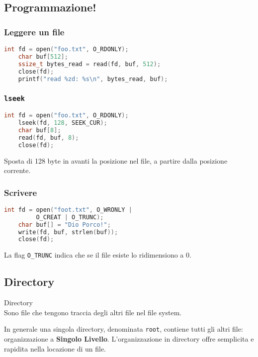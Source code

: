 \subsection{Programmazione!}
\subsubsection{Leggere un file}
\begin{lstlisting}[language=c]
    int fd = open("foo.txt", O_RDONLY);
    char buf[512];
    ssize_t bytes_read = read(fd, buf, 512);
    close(fd);
    printf("read %zd: %s\n", bytes_read, buf);
\end{lstlisting}

\subsubsection{\texttt{lseek}}
\begin{lstlisting}[language=c]
    int fd = open("foo.txt", O_RDONLY);
    lseek(fd, 128, SEEK_CUR);
    char buf[8];
    read(fd, buf, 8);
    close(fd);
\end{lstlisting}

Sposta di 128 byte in avanti la posizione nel file, a partire dalla posizione corrente.

\subsubsection{Scrivere}

\begin{lstlisting}[language=c]
    int fd = open("foot.txt", O_WRONLY |
         O_CREAT | O_TRUNC);
    char buf[] = "Dio Porco!";
    write(fd, buf, strlen(buf));
    close(fd);
\end{lstlisting}

La flag \lstinline{O_TRUNC} indica che se il file esiste lo ridimensiono a 0. 

\subsection{Directory}
\begin{definition} Directory \\
Sono file che tengono traccia degli altri file nel file system. 
\end{definition}

In generale una singola directory, denominata \texttt{root}, contiene tutti gli altri file: organizzazione a \textbf{Singolo Livello}.
L'organizzazione in directory offre semplicita e rapidita nella locazione di un file. 

